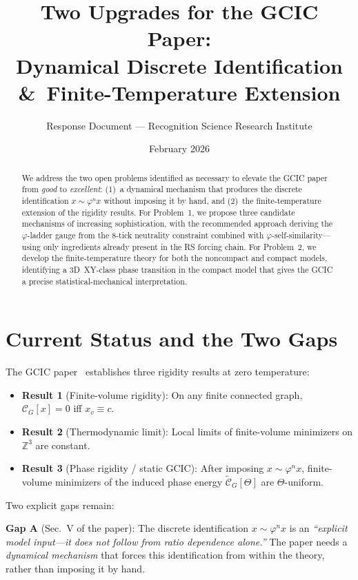 \documentclass[11pt]{article}
\title{Two Upgrades for the GCIC Paper:\\
Dynamical Discrete Identification \&\ Finite-Temperature Extension}
\author{Response Document --- Recognition Science Research Institute}
\date{February 2026}
\theoremstyle{definition}
\newcommand{\phig}{\varphi}
\newcommand{\Ctotal}{\mathcal{C}}
\begin{document}
\maketitle

\begin{abstract}
We address the two open problems identified as necessary to elevate the GCIC paper from \emph{good} to \emph{excellent}: (1)~a dynamical mechanism that produces the discrete identification $x \sim \phig^n x$ without imposing it by hand, and (2)~the finite-temperature extension of the rigidity results. For Problem~1, we propose three candidate mechanisms of increasing sophistication, with the recommended approach deriving the $\phig$-ladder gauge from the 8-tick neutrality constraint combined with $\phig$-self-similarity---using only ingredients already present in the RS forcing chain. For Problem~2, we develop the finite-temperature theory for both the noncompact and compact models, identifying a 3D~XY-class phase transition in the compact model that gives the GCIC a precise statistical-mechanical interpretation.
\end{abstract}

\tableofcontents

\section{Current Status and the Two Gaps}

The GCIC paper~\cite{GCIC} establishes three rigidity results at zero temperature:
\begin{itemize}[nosep]
\item \textbf{Result 1} (Finite-volume rigidity): On any finite connected graph, $\Ctotal_G[x] = 0$ iff $x_v \equiv c$.
\item \textbf{Result 2} (Thermodynamic limit): Local limits of finite-volume minimizers on $\mathbb{Z}^3$ are constant.
\item \textbf{Result 3} (Phase rigidity / static GCIC): After imposing $x \sim \phig^n x$, finite-volume minimizers of the induced phase energy $\tilde{\Ctotal}_G[\Theta]$ are $\Theta$-uniform.
\end{itemize}

Two explicit gaps remain:

\medskip\noindent
\textbf{Gap A} (Sec.~V of the paper): The discrete identification $x \sim \phig^n x$ is an \emph{``explicit model input---it does not follow from ratio dependence alone.''} The paper needs a \emph{dynamical mechanism} that forces this identification from within the theory, rather than imposing it by hand.
\end{document}
